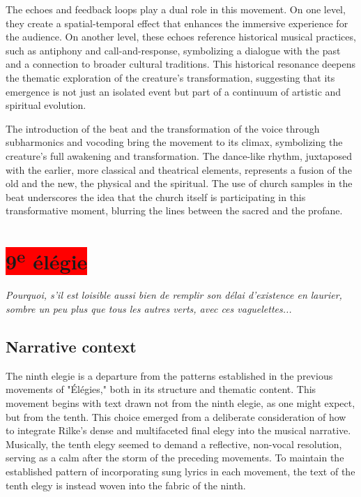 \documentclass[12pt,twoside,maitrise]{dms_ks}
\theoremstyle{definition}
\begin{document}
{The echoes and feedback loops play a dual role in this movement. 
On one level, they create a spatial-temporal effect that enhances the immersive experience for the audience. 
On another level, these echoes reference historical musical practices, such as antiphony and call-and-response, symbolizing a dialogue with the past and a connection to broader cultural traditions. 
This historical resonance deepens the thematic exploration of the creature’s transformation, suggesting that its emergence is not just an isolated event but part of a continuum of artistic and spiritual evolution.

The introduction of the beat and the transformation of the voice through subharmonics and vocoding bring the movement to its climax, symbolizing the creature’s full awakening and transformation. 
The dance-like rhythm, juxtaposed with the earlier, more classical and theatrical elements, represents a fusion of the old and the new, the physical and the spiritual. 
The use of church samples in the beat underscores the idea that the church itself is participating in this transformative moment, blurring the lines between the sacred and the profane.

\section{\colorbox{red}{9\textsuperscript{e} élégie}}

\epigraph{\textit{Pourquoi, s’il est loisible aussi bien de remplir son délai d’existence en laurier, sombre un peu plus que tous les autres verts, avec ces vaguelettes...}}{}

\subsection{Narrative context}

The ninth elegie is a departure from the patterns established in the previous movements of "Élégies," both in its structure and thematic content. 
This movement begins with text drawn not from the ninth elegie, as one might expect, but from the tenth. 
This choice emerged from a deliberate consideration of how to integrate Rilke’s dense and multifaceted final elegy into the musical narrative. 
Musically, the tenth elegy seemed to demand a reflective, non-vocal resolution, serving as a calm after the storm of the preceding movements. 
To maintain the established pattern of incorporating sung lyrics in each movement, the text of the tenth elegy is instead woven into the fabric of the ninth.

}
\end{document}
